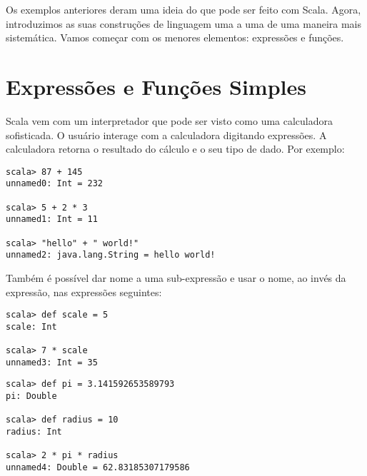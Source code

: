 Os exemplos anteriores deram uma ideia do que pode ser feito com Scala. Agora,
introduzimos as suas constru\c{c}\~{o}es de linguagem uma a uma de uma maneira mais sistem\'{a}tica.
Vamos come\c{c}ar com os menores elementos: express\~{o}es e fun\c{c}\~{o}es.


\section{Express\~{o}es e Fun\c{c}\~{o}es Simples}

Scala vem com um interpretador que pode ser visto como uma calculadora sofisticada.
O usu\'{a}rio interage com a calculadora digitando express\~{o}es. A calculadora retorna o
resultado do c\'{a}lculo e o seu tipo de dado. Por exemplo: 

\begin{lstlisting}
scala> 87 + 145
unnamed0: Int = 232

scala> 5 + 2 * 3
unnamed1: Int = 11

scala> "hello" + " world!"
unnamed2: java.lang.String = hello world!
\end{lstlisting}
Tamb\'{e}m \'{e} poss\'{i}vel dar nome a uma sub-express\~{a}o e usar o nome, ao inv\'{e}s da express\~{a}o, 
nas express\~{o}es seguintes:
\begin{lstlisting}
scala> def scale = 5
scale: Int

scala> 7 * scale
unnamed3: Int = 35
\end{lstlisting}
\begin{lstlisting}
scala> def pi = 3.141592653589793
pi: Double

scala> def radius = 10
radius: Int

scala> 2 * pi * radius
unnamed4: Double = 62.83185307179586
\end{lstlisting}



